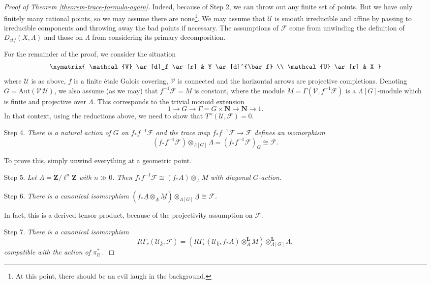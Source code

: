 \begin{proof}[Proof of Theorem \ref{theorem-trace-formula-again}]
\medskip\noindent
Indeed, because of Step 2, we can throw out any finite set of points. But we
have only finitely many rational points, so we may assume there are
none\footnote{At this point, there should be an evil laugh in the background.}.
We may assume that $\mathcal{U}$ is smooth irreducible and affine by passing to
irreducible components and throwing away the bad points if necessary. The
assumptions of $\mathcal{F}$ come from unwinding the definition of
$D_{ctf}(X, \Lambda)$ and those on $\Lambda$ from considering its primary
decomposition.

\medskip\noindent
For the remainder of the proof, we consider the situation
$$
\xymatrix{
\mathcal{V} \ar[d]_f \ar[r] & Y \ar[d]^{\bar f} \\
\mathcal{U} \ar[r] & X
}
$$
where $\mathcal{U}$ is as above, $f$ is a finite \'etale Galois covering,
$\mathcal{V}$ is connected and the horizontal arrows are projective
completions. Denoting $G=\text{Aut}(\mathcal{V}|\mathcal{U})$, we also assume
(as we may) that $f^{-1}\mathcal{F} =\underline M$ is constant, where the
module $M = \Gamma(\mathcal{V}, f^{-1}\mathcal{F})$ is a $\Lambda[G]$-module
which is finite and projective over $\Lambda$. This corresponds to the trivial
monoid extension
$$
1\to G\to \Gamma = G \times \mathbf{N}\to \mathbf{N}\to 1.
$$
In that context, using the reductions above, we need to show that
$T''(\mathcal{U}, \mathcal{F}) = 0$.

\medskip\noindent
Step 4. {\it There is a natural action of $G$ on $f_*f^{-1}\mathcal{F}$ and
the trace map $f_*f^{-1}\mathcal{F}\to \mathcal{F}$ defines an isomorphism}
$$
(f_*f^{-1}\mathcal{F})\otimes_{\Lambda[G]} \Lambda =
(f_*f^{-1}\mathcal{F})_G \cong \mathcal{F}.
$$

\medskip\noindent
To prove this, simply unwind everything at a geometric point.

\medskip\noindent
Step 5. {\it Let $A = \mathbf{Z}/\ell^n \mathbf{Z}$ with $n\gg 0$. Then
$f_*f^{-1}\mathcal{F} \cong (f_*\underline A)
\otimes_{\underline A} \underline M$ with diagonal $G$-action.}

\medskip\noindent
Step 6. {\it There is a canonical isomorphism
$(f_*\underline A \otimes_{\underline A} \underline M)
\otimes_{\Lambda[G]} \underline \Lambda \cong \mathcal{F}$.
}

\medskip\noindent
In fact, this is a derived tensor product, because of the projectivity
assumption on $\mathcal{F}$.

\medskip\noindent
Step 7. {\it There is a canonical isomorphism
$$
R\Gamma_c(\mathcal{U}_{\bar k}, \mathcal{F})
= (R\Gamma_c(\mathcal{U}_{\bar k}, f_*A)\otimes_A^\mathbf{L}
M)\otimes_{\Lambda[G]}^\mathbf{L} \Lambda,
$$
compatible with the action of $\pi^*_\mathcal{U}$.
}


\end{proof}
